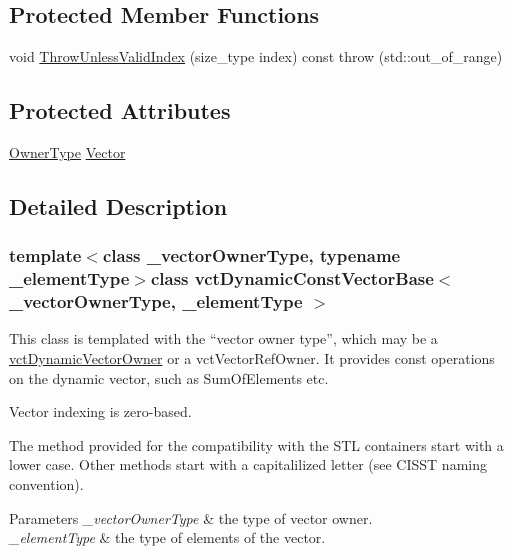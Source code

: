 \subsection*{Protected Member Functions}
\begin{DoxyCompactItemize}
\item 
void \hyperlink{classvct_dynamic_const_vector_base_ab8f95fc489f9d60c841100a21b010509}{Throw\-Unless\-Valid\-Index} (size\-\_\-type index) const   throw (std\-::out\-\_\-of\-\_\-range)
\end{DoxyCompactItemize}
\subsection*{Protected Attributes}
\begin{DoxyCompactItemize}
\item 
\hyperlink{classvct_dynamic_const_vector_base_a6d92548fcc7076cbd4c091ceb0faf364}{Owner\-Type} \hyperlink{classvct_dynamic_const_vector_base_a3cec7518a9b77eb391a9d19220e4b892}{Vector}
\end{DoxyCompactItemize}


\subsection{Detailed Description}
\subsubsection*{template$<$class \-\_\-vector\-Owner\-Type, typename \-\_\-element\-Type$>$class vct\-Dynamic\-Const\-Vector\-Base$<$ \-\_\-vector\-Owner\-Type, \-\_\-element\-Type $>$}

This class is templated with the ``vector owner type'', which may be a \hyperlink{classvct_dynamic_vector_owner}{vct\-Dynamic\-Vector\-Owner} or a vct\-Vector\-Ref\-Owner. It provides const operations on the dynamic vector, such as Sum\-Of\-Elements etc.

Vector indexing is zero-\/based.

The method provided for the compatibility with the S\-T\-L containers start with a lower case. Other methods start with a capitalilized letter (see C\-I\-S\-S\-T naming convention).


\begin{DoxyParams}{Parameters}
{\em \-\_\-vector\-Owner\-Type} & the type of vector owner.\\
\hline
{\em \-\_\-element\-Type} & the type of elements of the vector. \\
\hline
\end{DoxyParams}


